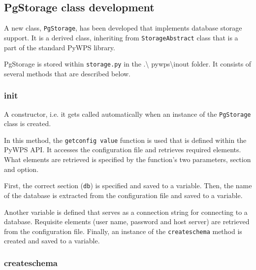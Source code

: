 \subsection{PgStorage class development} 

A new class, \texttt{PgStorage}, has been developed that implements
database storage support. It is a derived class, inheriting from
\texttt{StorageAbstract} class that is a part of the standard PyWPS
library.

PgStorage is stored within \texttt{storage.py} in the .\textbackslash
pywps\textbackslash inout folder. It consists of several methods that
are described below.

\subsubsection{\textunderscore \textunderscore init\textunderscore \textunderscore } 
A constructor, i.e. it gets called automatically when an instance of
the \texttt{PgStorage} class is created.

In this method, the \texttt{get\textunderscore config\textunderscore
  value} function is used that is defined within the PyWPS API. It
accesses the configuration file and retrieves required elements. What
elements are retrieved is specified by the function's two parameters,
section and option.

First, the correct section (\texttt{db}) is specified and saved to a
variable. Then, the name of the database is extracted from the
configuration file and saved to a variable.

Another variable is defined that serves as a connection string for
connecting to a database. Requisite elements (user name, password and
host server) are retrieved from the configuration file. Finally, an
instance of the \texttt{\textunderscore create\textunderscore schema}
method is created and saved to a variable.


\subsubsection{\textunderscore create\textunderscore schema} 

